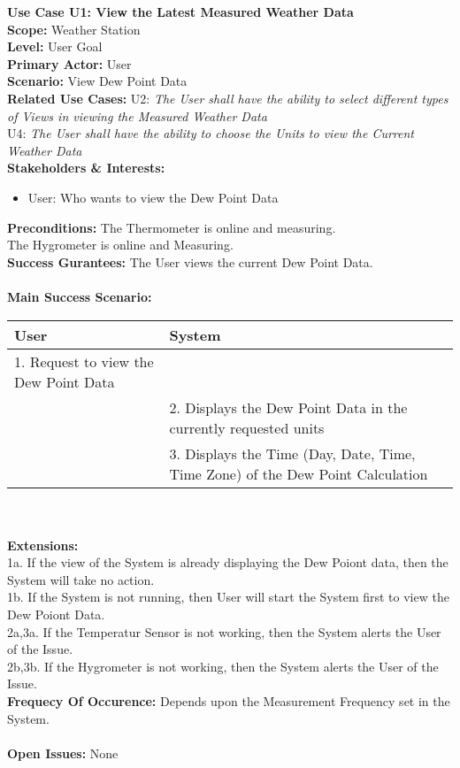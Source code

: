\documentclass[letterpaper]{article}
\begin{document}
\noindent
\textbf{Use Case U1:  View the Latest Measured Weather Data}\\
\textbf{Scope:  }Weather Station\\
\textbf{Level:  }User Goal\\
\textbf{Primary Actor:  }User\\
\textbf{Scenario:  }View Dew Point Data\\
\textbf{Related Use Cases:  }U2: \textit{The User shall have the
ability to select different types of Views in viewing the Measured
Weather Data}\\ U4:  \textit{The User shall have the ability to
choose the Units to view the Current Weather Data}\\
\textbf{Stakeholders \& Interests:  }
\begin{itemize}
\item User:  Who wants to view the Dew Point Data
\end{itemize}
\textbf{Preconditions:  }The Thermometer is online and measuring.\\
The Hygrometer is online and Measuring.\\
\textbf{Success Gurantees:  }The User views the current Dew Point
Data.\\\\
\textbf{Main Success Scenario:  }\\
\begin{tabular}{|p{6cm}|p{6cm}|}\hline
\textbf{User} & \textbf{System}\\\hline
1.  Request to view the Dew Point Data & \\\hline
& 2.  Displays the Dew Point Data in the currently requested
units\\\hline
& 3.  Displays the Time (Day, Date, Time, Time Zone) of the
Dew Point Calculation\\\hline
\end{tabular}\\\\
\textbf{Extensions:  }\\
1a.  If the view of the System is already displaying the Dew Poiont
data, then the System will take no action.\\
1b.  If the System is not running, then User will start the System
first to view the Dew Poiont Data.\\
2a,3a.  If the Temperatur Sensor is not working, then the System
alerts the User of the Issue.\\
2b,3b.  If the Hygrometer is not working, then the System alerts the
User of the Issue.\\
\textbf{Frequecy Of Occurence: } Depends upon the Measurement
Frequency set in the System.\\\\
\textbf{Open Issues: } None
\end{document}
